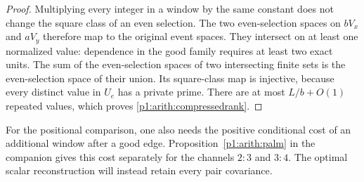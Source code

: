 \begin{proof}
Multiplying every integer in a window by the same constant does not change
the square class of an even selection.  The two even-selection spaces on
$bV_x$ and $aV_y$ therefore map to the original event spaces.  They intersect
on at least one normalized value: dependence in the good family requires
at least two exact units.  The sum of the even-selection spaces of two
intersecting finite sets is the even-selection space of their union.  Its
square-class map is injective, because every distinct value in $U_e$ has a
private prime.  There are at most $L/b+O(1)$ repeated values, which proves
\eqref{p1:arith:compressedrank}.
\end{proof}

For the positional comparison, one also needs the positive conditional
cost of an additional window after a good edge. Proposition~\ref{p1:arith:palm}
in the companion gives this cost separately for the channels $2:3$ and $3:4$.
The optimal scalar reconstruction will instead retain every pair covariance.
